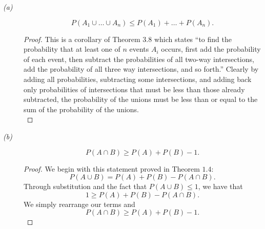 \documentclass{tufte-handout}
\begin{document}
\begin{description}
\item[\emph{(a)}]
  \[
  P(A_1 \cup \dots \cup A_n) \leq P(A_1) + \dots + P(A_n).
  \]

  \begin{proof} This is a corollary of Theorem $3.8$ which states ``to
    find the probability that at least one of $n$ events $A_i$ occurs,
    first add the probability of each event, then subtract the
    probabilities of all two-way intersections, add the probability of
    all three way intersections, and so forth.'' Clearly by adding all
    probabilities, subtracting some intersections, and adding back
    only probabilities of intersections that must be less than those
    already subtracted, the probability of the unions must be less
    than or equal to the sum
    of the probability of the unions.\\
  \end{proof}

\item[\emph{(b)}] 
  \[P(A \cap B) \geq P(A) + P(B) - 1.\]

  \begin{proof}
    We begin with this statement proved in Theorem $1.4$:
    \[P(A \cup B) = P(A) + P(B) - P(A \cap B).\]
    Through substitution and the fact that $P(A \cup B) \leq 1$, we
    have that
    \[1 \geq P(A) + P(B) - P(A \cap B).\]
    We simply rearrange our terms and
    \[P(A \cap B) \geq P(A) + P(B) - 1.\]
  \end{proof}
\end{description}
\end{document}
